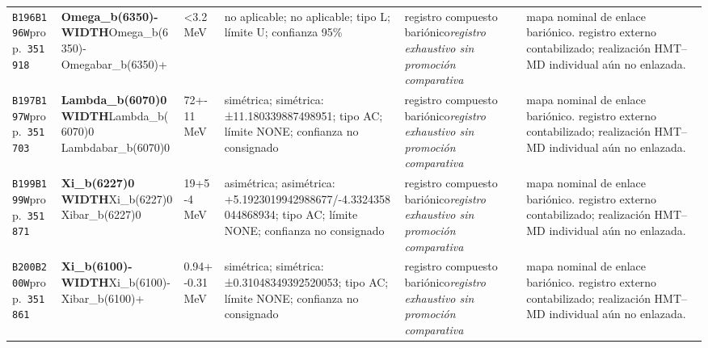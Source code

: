 \begin{landscape}
\begin{longtable}{L{1.85cm}L{4.45cm}L{2.35cm}L{4.05cm}L{3.35cm}L{7.15cm}}
\texttt{B196}\newline \texttt{B196W}\newline prop.\ \texttt{351918} & \textbf{Omega\_\allowbreak{}b(6350)- WIDTH}\newline Omega\_\allowbreak{}b(6350)- \textbar{}\allowbreak{} Omegabar\_\allowbreak{}b(6350)+ & \textless{}3.2\,MeV & no aplicable; no aplicable; tipo L; límite U; confianza 95\% & registro compuesto bariónico\newline \emph{registro exhaustivo sin promoción comparativa} & mapa nominal de enlace bariónico. registro externo contabilizado; realización HMT--MD individual aún no enlazada. \\
\texttt{B197}\newline \texttt{B197W}\newline prop.\ \texttt{351703} & \textbf{Lambda\_\allowbreak{}b(6070)0 WIDTH}\newline Lambda\_\allowbreak{}b(6070)0 \textbar{}\allowbreak{} Lambdabar\_\allowbreak{}b(6070)0 & 72+-11\,MeV & simétrica; simétrica: ±11.180339887498951; tipo AC; límite NONE; confianza no consignado & registro compuesto bariónico\newline \emph{registro exhaustivo sin promoción comparativa} & mapa nominal de enlace bariónico. registro externo contabilizado; realización HMT--MD individual aún no enlazada. \\
\texttt{B199}\newline \texttt{B199W}\newline prop.\ \texttt{351871} & \textbf{Xi\_\allowbreak{}b(6227)0 WIDTH}\newline Xi\_\allowbreak{}b(6227)0 \textbar{}\allowbreak{} Xibar\_\allowbreak{}b(6227)0 & 19+5-4\,MeV & asimétrica; asimétrica: +5.1923019942988677/-4.3324358044868934; tipo AC; límite NONE; confianza no consignado & registro compuesto bariónico\newline \emph{registro exhaustivo sin promoción comparativa} & mapa nominal de enlace bariónico. registro externo contabilizado; realización HMT--MD individual aún no enlazada. \\
\texttt{B200}\newline \texttt{B200W}\newline prop.\ \texttt{351861} & \textbf{Xi\_\allowbreak{}b(6100)- WIDTH}\newline Xi\_\allowbreak{}b(6100)- \textbar{}\allowbreak{} Xibar\_\allowbreak{}b(6100)+ & 0.94+-0.31\,MeV & simétrica; simétrica: ±0.31048349392520053; tipo AC; límite NONE; confianza no consignado & registro compuesto bariónico\newline \emph{registro exhaustivo sin promoción comparativa} & mapa nominal de enlace bariónico. registro externo contabilizado; realización HMT--MD individual aún no enlazada. \\

\end{longtable}
\end{landscape}
